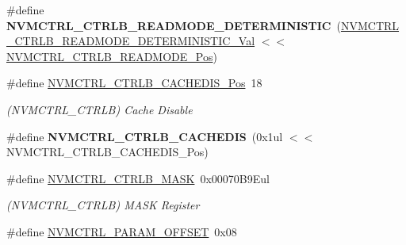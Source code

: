 \begin{DoxyCompactItemize}
\item 
\hypertarget{group___s_a_m_l21___n_v_m_c_t_r_l_gafb30f0bebe63e725ddd44be344011985}{}\#define {\bfseries N\+V\+M\+C\+T\+R\+L\+\_\+\+C\+T\+R\+L\+B\+\_\+\+R\+E\+A\+D\+M\+O\+D\+E\+\_\+\+D\+E\+T\+E\+R\+M\+I\+N\+I\+S\+T\+I\+C}~(\hyperlink{group___s_a_m_l21___n_v_m_c_t_r_l_ga330c07f70cd004957ce3ab80e77f06d8}{N\+V\+M\+C\+T\+R\+L\+\_\+\+C\+T\+R\+L\+B\+\_\+\+R\+E\+A\+D\+M\+O\+D\+E\+\_\+\+D\+E\+T\+E\+R\+M\+I\+N\+I\+S\+T\+I\+C\+\_\+\+Val} $<$$<$ \hyperlink{group___s_a_m_l21___n_v_m_c_t_r_l_ga46b5014db97bf5ce4da54dce52d162f9}{N\+V\+M\+C\+T\+R\+L\+\_\+\+C\+T\+R\+L\+B\+\_\+\+R\+E\+A\+D\+M\+O\+D\+E\+\_\+\+Pos})\label{group___s_a_m_l21___n_v_m_c_t_r_l_gafb30f0bebe63e725ddd44be344011985}

\item 
\hypertarget{group___s_a_m_l21___n_v_m_c_t_r_l_gaf4c3e69fb60d156a007a7edd11022b55}{}\#define \hyperlink{group___s_a_m_l21___n_v_m_c_t_r_l_gaf4c3e69fb60d156a007a7edd11022b55}{N\+V\+M\+C\+T\+R\+L\+\_\+\+C\+T\+R\+L\+B\+\_\+\+C\+A\+C\+H\+E\+D\+I\+S\+\_\+\+Pos}~18\label{group___s_a_m_l21___n_v_m_c_t_r_l_gaf4c3e69fb60d156a007a7edd11022b55}

\begin{DoxyCompactList}\small\item\em (N\+V\+M\+C\+T\+R\+L\+\_\+\+C\+T\+R\+L\+B) Cache Disable \end{DoxyCompactList}\item 
\hypertarget{group___s_a_m_l21___n_v_m_c_t_r_l_gab1f4105b83a240096ef70c4a9c989907}{}\#define {\bfseries N\+V\+M\+C\+T\+R\+L\+\_\+\+C\+T\+R\+L\+B\+\_\+\+C\+A\+C\+H\+E\+D\+I\+S}~(0x1ul $<$$<$ N\+V\+M\+C\+T\+R\+L\+\_\+\+C\+T\+R\+L\+B\+\_\+\+C\+A\+C\+H\+E\+D\+I\+S\+\_\+\+Pos)\label{group___s_a_m_l21___n_v_m_c_t_r_l_gab1f4105b83a240096ef70c4a9c989907}

\item 
\hypertarget{group___s_a_m_l21___n_v_m_c_t_r_l_gaaf2272ac3ee696dfe0d222a87bc7cbe1}{}\#define \hyperlink{group___s_a_m_l21___n_v_m_c_t_r_l_gaaf2272ac3ee696dfe0d222a87bc7cbe1}{N\+V\+M\+C\+T\+R\+L\+\_\+\+C\+T\+R\+L\+B\+\_\+\+M\+A\+S\+K}~0x00070\+B9\+Eul\label{group___s_a_m_l21___n_v_m_c_t_r_l_gaaf2272ac3ee696dfe0d222a87bc7cbe1}

\begin{DoxyCompactList}\small\item\em (N\+V\+M\+C\+T\+R\+L\+\_\+\+C\+T\+R\+L\+B) M\+A\+S\+K Register \end{DoxyCompactList}\item 
\hypertarget{group___s_a_m_l21___n_v_m_c_t_r_l_ga6624597605fc956079a9818778a34abe}{}\#define \hyperlink{group___s_a_m_l21___n_v_m_c_t_r_l_ga6624597605fc956079a9818778a34abe}{N\+V\+M\+C\+T\+R\+L\+\_\+\+P\+A\+R\+A\+M\+\_\+\+O\+F\+F\+S\+E\+T}~0x08\label{group___s_a_m_l21___n_v_m_c_t_r_l_ga6624597605fc956079a9818778a34abe}


\end{DoxyCompactItemize}
